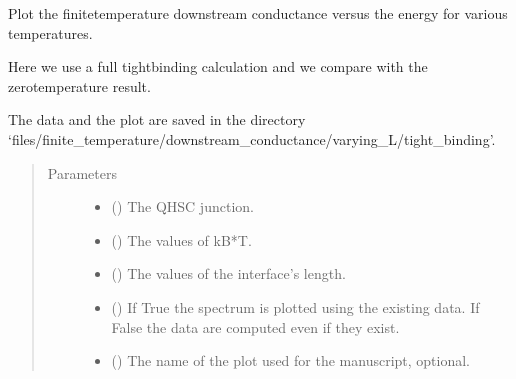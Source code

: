 \documentclass[letterpaper,10pt,english]{sphinxmanual}
\begin{document}
\begin{fulllineitems}
\label{\detokenize{modules:modules.utils.plot_finite_T_conductance_TB_vs_L_various_temps}}
\pysigstartsignatures
{}
\pysigstopsignatures
\sphinxAtStartPar
Plot the finite\sphinxhyphen{}temperature downstream conductance versus the energy for various temperatures.

\sphinxAtStartPar
Here we use a full tight\sphinxhyphen{}binding calculation and we compare with the zero\sphinxhyphen{}temperature result.

\sphinxAtStartPar
The data and the plot are saved in the directory
‘files/finite\_temperature/downstream\_conductance/varying\_L/tight\_binding’.
\begin{quote}\begin{description}
\item[{Parameters}] \leavevmode\begin{itemize}
\item {} 
\sphinxAtStartPar
{} () \textendash{} The QH\sphinxhyphen{}SC junction.

\item {} 
\sphinxAtStartPar
{} () \textendash{} The values of kB*T.

\item {} 
\sphinxAtStartPar
{} () \textendash{} The values of the interface’s length.

\item {} 
\sphinxAtStartPar
{} () \textendash{} If True the spectrum is plotted using the existing data.
If False the data are computed even if they exist.

\item {} 
\sphinxAtStartPar
{} () \textendash{} The name of the plot used for the manuscript, optional.

\end{itemize}

\end{description}\end{quote}

\end{fulllineitems}
\end{document}
